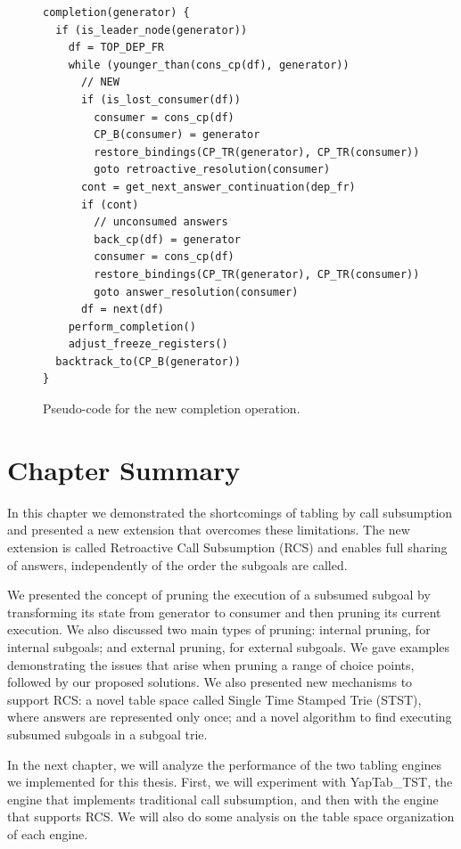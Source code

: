 \begin{figure}[ht]
\begin{Verbatim}
completion(generator) {
  if (is_leader_node(generator))
    df = TOP_DEP_FR
    while (younger_than(cons_cp(df), generator))
      // NEW
      if (is_lost_consumer(df))
        consumer = cons_cp(df)
        CP_B(consumer) = generator
        restore_bindings(CP_TR(generator), CP_TR(consumer))
        goto retroactive_resolution(consumer)
      cont = get_next_answer_continuation(dep_fr)
      if (cont)
        // unconsumed answers
        back_cp(df) = generator
        consumer = cons_cp(df)
        restore_bindings(CP_TR(generator), CP_TR(consumer))
        goto answer_resolution(consumer)
      df = next(df)
    perform_completion()
    adjust_freeze_registers()
  backtrack_to(CP_B(generator))
}
\end{Verbatim}
\caption{Pseudo-code for the new completion operation.}
\label{fig:completion_operation_retro}
\end{figure}

\section{Chapter Summary}

In this chapter we demonstrated the shortcomings of tabling by call subsumption and presented a
new extension that overcomes these limitations. The new extension is called Retroactive Call Subsumption (RCS)
and enables full sharing of answers, independently of the order the subgoals are called.

We presented the concept of pruning the execution of a subsumed subgoal by transforming its state from
generator to consumer and then pruning its current execution. We also discussed two main types of pruning:
internal pruning, for internal subgoals; and external pruning, for external subgoals.
We gave examples demonstrating the issues that arise when pruning a range of choice points, followed
by our proposed solutions.
We also presented new mechanisms to support RCS: a novel table space called Single Time Stamped Trie (STST),
where answers are represented only once; and a novel algorithm to find executing subsumed subgoals in a subgoal
trie.

In the next chapter, we will analyze the performance of the two tabling engines we implemented for this thesis.
First, we will experiment with YapTab\_TST, the engine that implements traditional call subsumption, and then
with the engine that supports RCS. We will also do some analysis on the table space organization of each engine.
